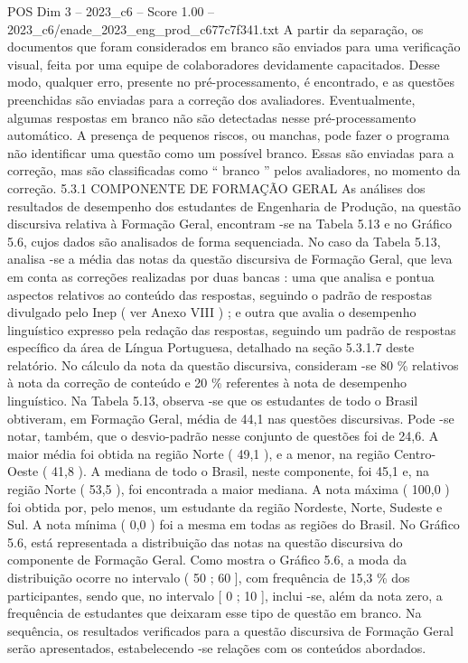 \begin{textsample}{POS Dim 3 – 2023\_c6 – Score 1.00 – 2023\_c6/enade\_2023\_eng\_prod\_c677c7f341.txt}
A partir da separação, os documentos que foram considerados em branco são enviados para uma verificação visual, feita por uma equipe de colaboradores devidamente capacitados.
Desse modo, qualquer erro, presente no pré-processamento, é encontrado, e as questões preenchidas são enviadas para a correção dos avaliadores.
Eventualmente, algumas respostas em branco não são detectadas nesse pré-processamento automático.
A presença de pequenos riscos, ou manchas, pode fazer o programa não identificar uma questão como um possível branco.
Essas são enviadas para a correção, mas são classificadas como “ branco ” pelos avaliadores, no momento da correção. 5.3.1 COMPONENTE DE FORMAÇÃO GERAL As análises dos resultados de desempenho dos estudantes de Engenharia de Produção, na questão discursiva relativa à Formação Geral, encontram -se na Tabela 5.13 e no Gráfico 5.6, cujos dados são analisados de forma sequenciada.
No caso da Tabela 5.13, analisa -se a média das notas da questão discursiva de Formação Geral, que leva em conta as correções realizadas por duas bancas : uma que analisa e pontua aspectos relativos ao conteúdo das respostas, seguindo o padrão de respostas divulgado pelo Inep ( ver Anexo VIII ) ; e outra que avalia o desempenho linguístico expresso pela redação das respostas, seguindo um padrão de respostas específico da área de Língua Portuguesa, detalhado na seção 5.3.1.7 deste relatório.
No cálculo da nota da questão discursiva, consideram -se 80 \% relativos à nota da correção de conteúdo e 20 \% referentes à nota de desempenho linguístico.
Na Tabela 5.13, observa -se que os estudantes de todo o Brasil obtiveram, em Formação Geral, média de 44,1 nas questões discursivas.
Pode -se notar, também, que o desvio-padrão nesse conjunto de questões foi de 24,6.
A maior média foi obtida na região Norte ( 49,1 ), e a menor, na região Centro-Oeste ( 41,8 ).
A mediana de todo o Brasil, neste componente, foi 45,1 e, na região Norte ( 53,5 ), foi encontrada a maior mediana.
A nota máxima ( 100,0 ) foi obtida por, pelo menos, um estudante da região Nordeste, Norte, Sudeste e Sul.
A nota mínima ( 0,0 ) foi a mesma em todas as regiões do Brasil.
No Gráfico 5.6, está representada a distribuição das notas na questão discursiva do componente de Formação Geral.
Como mostra o Gráfico 5.6, a moda da distribuição ocorre no intervalo ( 50 ; 60 ], com frequência de 15,3 \% dos participantes, sendo que, no intervalo [ 0 ; 10 ], inclui -se, além da nota zero, a frequência de estudantes que deixaram esse tipo de questão em branco.
Na sequência, os resultados verificados para a questão discursiva de Formação Geral serão apresentados, estabelecendo -se relações com os conteúdos abordados.

\end{textsample}
